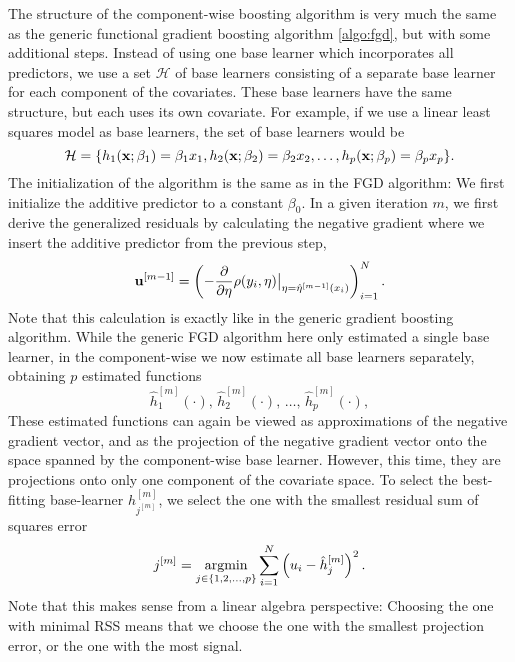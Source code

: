 The structure of the component-wise boosting algorithm is very much the same as the generic functional gradient boosting algorithm \eqref{algo:fgd}, but with some additional steps. Instead of using one base learner which incorporates all predictors,
we use a set $\mathcal{H}$ of base learners consisting of a separate base learner for each component of the covariates.
These base learners have the same structure, but each uses its own covariate. For example, if we use a linear least squares model as base 
learners, the set of base learners would be
\begin{equation}
    \mathcal{H}=\{h_1(\mathbf{x};\beta_1)=\beta_1 x_1,h_2(\mathbf{x};\beta_2)=\beta_2 x_2,\ldots,h_p(\mathbf{x};\beta_p)=\beta_p x_p \}.
\end{equation}
The initialization of the algorithm is the same as in the FGD algorithm:
We first initialize the additive predictor to a constant $\beta_0$.
In a given iteration $m$, we first derive the generalized residuals by calculating 
the negative gradient where we insert the additive predictor from the previous step,
\begin{equation}
    \mathbf{u}^{[m-1]}=\left(-\frac{\partial}{\partial \eta}\rho(y_i, \eta)\big\rvert_{\eta=\hat{\eta}^{[m-1]}(x_i)}\right)_{i=1}^N.
\end{equation}
Note that this calculation is exactly like in the generic gradient boosting algorithm.
While the generic FGD algorithm here only estimated a single base learner, in the component-wise we now estimate all base learners separately, obtaining $p$ estimated functions
\begin{equation}
    \hat{h}_1^{[m]}(\cdot),\,\hat{h}_2^{[m]}(\cdot),\,\ldots,\,\hat{h}_p^{[m]}(\cdot),
\end{equation}
These estimated functions can again be viewed as approximations of the negative gradient vector, and as the projection of the negative gradient vector onto the space spanned by the component-wise base learner. However, this time, they are projections onto
only one component of the covariate space. To select the best-fitting base-learner $h_{j^{[m]}}^{[m]}$, we select the one with
the smallest residual sum of squares error
\begin{equation}
    j^{[m]}=\operatorname*{argmin}_{j\in\{1,2,\ldots,p\}}\sum_{i=1}^N \left(u_i-\hat{h}_j^{[m]}\right)^2.
\end{equation}
Note that this makes sense from a linear algebra perspective: Choosing the one with minimal RSS means that we choose the one with the
smallest projection error, or the one with the most signal.
